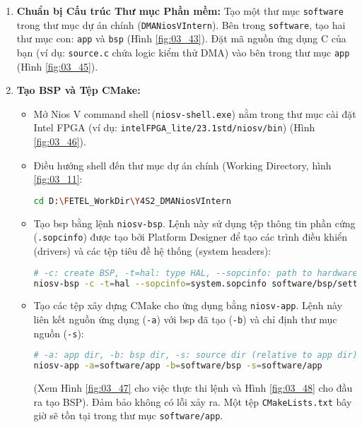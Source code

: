 \begin{enumerate}
    \item \textbf{Chuẩn bị Cấu trúc Thư mục Phần mềm:} Tạo một thư mục \texttt{software} trong thư mục dự án chính (\texttt{DMANiosVIntern}). Bên trong \texttt{software}, tạo hai thư mục con: \texttt{app} và \texttt{bsp} (Hình \ref{fig:03_43}). Đặt mã nguồn ứng dụng C của bạn (ví dụ: \texttt{source.c} chứa logic kiểm thử DMA) vào bên trong thư mục \texttt{app} (Hình \ref{fig:03_45}).
    \item \textbf{Tạo BSP và Tệp CMake:}
    \begin{itemize}
        \item Mở Nios V command shell (\texttt{niosv-shell.exe}) nằm trong thư mục cài đặt Intel FPGA (ví dụ: \texttt{intelFPGA\_lite/23.1std/niosv/bin}) (Hình \ref{fig:03_46}).
        \item Điều hướng shell đến thư mục dự án chính (Working Directory, hình \ref{fig:03_11}:
        \begin{lstlisting}[language=bash, caption={Điều hướng trong Nios V Shell}, label=lst:cd_project]
cd D:\FETEL_WorkDir\Y4S2_DMANiosVIntern \end{lstlisting}
        \item Tạo \acrshort{bsp} bằng lệnh \texttt{niosv-bsp}. Lệnh này sử dụng tệp thông tin phần cứng (\texttt{.sopcinfo}) được tạo bởi Platform Designer để tạo các trình điều khiển (drivers) và các tệp tiêu đề hệ thống (system headers):
        \begin{lstlisting}[language=bash, caption={Lệnh tạo BSP Nios V}, label=lst:gen_bsp]
# -c: create BSP, -t=hal: type HAL, --sopcinfo: path to hardware info
niosv-bsp -c -t=hal --sopcinfo=system.sopcinfo software/bsp/settings.bsp \end{lstlisting}
        \item Tạo các tệp xây dựng CMake cho ứng dụng bằng \texttt{niosv-app}. Lệnh này liên kết nguồn ứng dụng (\texttt{-a}) với \acrshort{bsp} đã tạo (\texttt{-b}) và chỉ định thư mục nguồn (\texttt{-s}):
        \begin{lstlisting}[language=bash, caption={Lệnh tạo tệp CMake ứng dụng Nios V}, label=lst:gen_app]
# -a: app dir, -b: bsp dir, -s: source dir (relative to app dir)
niosv-app -a=software/app -b=software/bsp -s=software/app \end{lstlisting}
        (Xem Hình \ref{fig:03_47} cho việc thực thi lệnh và Hình \ref{fig:03_48} cho đầu ra tạo BSP). Đảm bảo không có lỗi xảy ra. Một tệp \texttt{CMakeLists.txt} bây giờ sẽ tồn tại trong thư mục \texttt{software/app}.

\end{itemize}
\end{enumerate}
